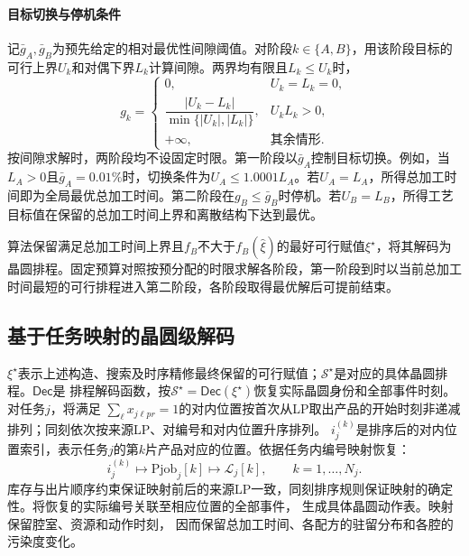 \documentclass[preprint,12pt,nonatbib]{elsarticle}
\begin{document}
\paragraph{目标切换与停机条件}
记$\bar g_A,\bar g_B$为预先给定的相对最优性间隙阈值。对阶段$k\in\{A,B\}$，用该阶段目标的可行上界$U_k$和对偶下界$L_k$计算间隙。两界均有限且$L_k\le U_k$时，
\begin{equation}
g_k=
\begin{cases}
0, & U_k=L_k=0,\\[2pt]
\dfrac{|U_k-L_k|}{\min\{|U_k|,|L_k|\}}, & U_kL_k>0,\\[5pt]
+\infty, & \text{其余情形}.
\end{cases}
\label{eq:stage-relative-gap-cn}
\end{equation}
按间隙求解时，两阶段均不设固定时限。第一阶段以$\bar g_A$控制目标切换。例如，当$L_A>0$且$\bar g_A=0.01\%$时，切换条件为$U_A\le1.0001L_A$。若$U_A=L_A$，所得总加工时间即为全局最优总加工时间。第二阶段在$g_B\le\bar g_B$时停机。若$U_B=L_B$，所得工艺目标值在保留的总加工时间上界和离散结构下达到最优。

算法保留满足总加工时间上界且$f_B$不大于$f_B(\widehat\xi)$的最好可行赋值$\xi^\star$，将其解码为晶圆排程。固定预算对照按预分配的时限求解各阶段，第一阶段到时以当前总加工时间最短的可行排程进入第二阶段，各阶段取得最优解后可提前结束。

\subsection{基于任务映射的晶圆级解码}
\label{sec:pjob-decoding-cn}

$\xi^\star$表示上述构造、搜索及时序精修最终保留的可行赋值；$\mathcal S^\star$是对应的具体晶圆排程。$\mathsf{Dec}$是
排程解码函数，按$\mathcal S^\star=\mathsf{Dec}(\xi^\star)$恢复实际晶圆身份和全部事件时刻。对任务$j$，将满足
$\sum_\ell x_{j\ell pr}=1$的对内位置按首次从LP取出产品的开始时刻非递减排列；同刻依次按来源LP、对编号和对内位置升序排列。
$i_j^{(k)}$是排序后的对内位置索引，表示任务$j$的第$k$片产品对应的位置。依据任务内编号映射恢复：
\begin{equation}
i_j^{(k)}\longmapsto\mathrm{Pjob}_j[k]
\longmapsto\mathcal L_j[k],\qquad k=1,\ldots,N_j.
\label{eq:pjob-decoding-cn}
\end{equation}
库存与出片顺序约束保证映射前后的来源LP一致，同刻排序规则保证映射的确定性。将恢复的实际编号关联至相应位置的全部事件，
生成具体晶圆动作表。映射保留腔室、资源和动作时刻，
因而保留总加工时间、各配方的驻留分布和各腔的污染度变化。
\end{document}

